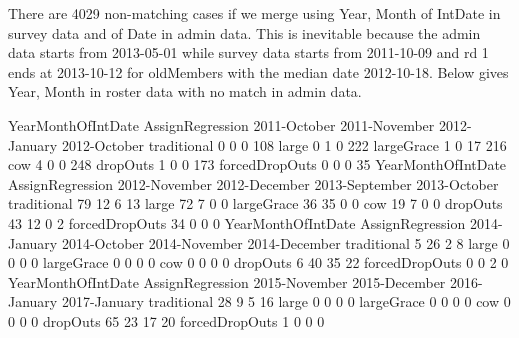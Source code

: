 There are 4029 non-matching cases if we merge using \textsf{Year, Month} of \textsf{IntDate} in survey data and of \textsf{Date} in admin data. This is inevitable because the admin data starts from 2013-05-01 while survey data starts from 2011-10-09 and rd 1 ends at 2013-10-12 for \textsf{oldMember}s with the median date 2012-10-18. Below gives \textsf{Year, Month} in roster data with no match in admin data.
\begin{Schunk}
\begin{Soutput}
                YearMonthOfIntDate
AssignRegression 2011-October 2011-November 2012-January 2012-October
  traditional               0             0            0          108
  large                     0             1            0          222
  largeGrace                1             0           17          216
  cow                       4             0            0          248
  dropOuts                  1             0            0          173
  forcedDropOuts            0             0            0           35
                YearMonthOfIntDate
AssignRegression 2012-November 2012-December 2013-September 2013-October
  traditional               79            12              6           13
  large                     72             7              0            0
  largeGrace                36            35              0            0
  cow                       19             7              0            0
  dropOuts                  43            12              0            2
  forcedDropOuts            34             0              0            0
                YearMonthOfIntDate
AssignRegression 2014-January 2014-October 2014-November 2014-December
  traditional               5           26             2             8
  large                     0            0             0             0
  largeGrace                0            0             0             0
  cow                       0            0             0             0
  dropOuts                  6           40            35            22
  forcedDropOuts            0            0             2             0
                YearMonthOfIntDate
AssignRegression 2015-November 2015-December 2016-January 2017-January
  traditional               28             9            5           16
  large                      0             0            0            0
  largeGrace                 0             0            0            0
  cow                        0             0            0            0
  dropOuts                  65            23           17           20
  forcedDropOuts             1             0            0            0

\end{Soutput}
\end{Schunk}
